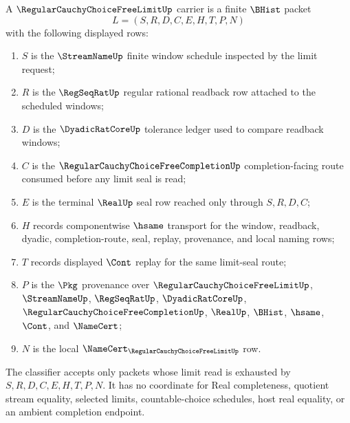 \begin{definition}
\label{def:regular-cauchy-choice-free-limit-carrier}
A $\RegularCauchyChoiceFreeLimitUp$ carrier is a finite $\BHist$ packet
$$
L=(S,R,D,C,E,H,T,P,N)
$$
with the following displayed rows:
\begin{enumerate}
\item $S$ is the $\StreamNameUp$ finite window schedule inspected by the limit request;
\item $R$ is the $\RegSeqRatUp$ regular rational readback row attached to the scheduled windows;
\item $D$ is the $\DyadicRatCoreUp$ tolerance ledger used to compare readback windows;
\item $C$ is the $\RegularCauchyChoiceFreeCompletionUp$ completion-facing route consumed before any limit seal is read;
\item $E$ is the terminal $\RealUp$ seal row reached only through $S,R,D,C$;
\item $H$ records componentwise $\hsame$ transport for the window, readback, dyadic, completion-route, seal, replay, provenance, and local naming rows;
\item $T$ records displayed $\Cont$ replay for the same limit-seal route;
\item $P$ is the $\Pkg$ provenance over $\RegularCauchyChoiceFreeLimitUp$, $\StreamNameUp$, $\RegSeqRatUp$, $\DyadicRatCoreUp$, $\RegularCauchyChoiceFreeCompletionUp$, $\RealUp$, $\BHist$, $\hsame$, $\Cont$, and $\NameCert$;
\item $N$ is the local $\NameCert_{\RegularCauchyChoiceFreeLimitUp}$ row.
\end{enumerate}
The classifier accepts only packets whose limit read is exhausted by $S,R,D,C,E,H,T,P,N$. It has no coordinate for Real completeness, quotient stream equality, selected limits, countable-choice schedules, host real equality, or an ambient completion endpoint.
\end{definition}

